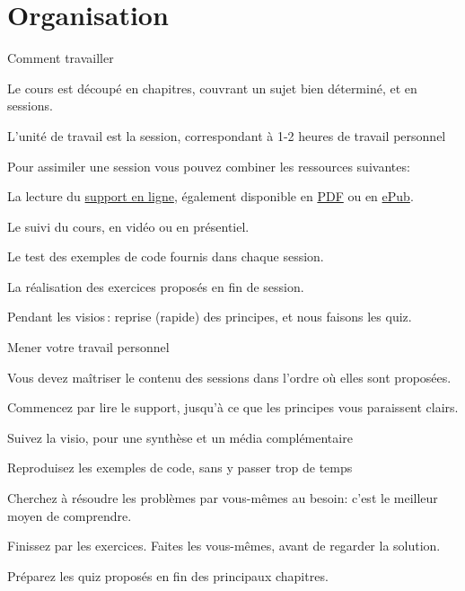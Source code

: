 \section{Organisation}
\begin{frame}{Comment travailler}

Le cours est découpé en \alert{chapitres}, couvrant un sujet bien déterminé, et en \alert{sessions}.

\smallskip

\alert{L'unité de travail est la session}, correspondant à 1-2 heures de travail personnel

\vfill


Pour assimiler une session vous pouvez combiner les ressources suivantes:

\begin{redbullet}
  \item \alert{La lecture} du \href{http://b3d.bdpedia.fr}{support en ligne}, 
       également disponible en \href{http://b3d.bdpedia.fr/files/b3d.pdf}{PDF} ou en 
       \href{http://b3d.bdpedia.fr/files/b3d.epub}{ePub}.
    \item \alert{Le suivi du cours}, en vidéo ou en présentiel.
   \item \alert{Le test des exemples de code} fournis dans chaque session.
   \item \alert{La réalisation des exercices} proposés en fin de session.
\end{redbullet}

\vfill
\begin{blocgauche}
Pendant les visios\,: reprise (rapide) des principes, et nous
faisons les quiz.
\end{blocgauche}

\end{frame}

\begin{frame}{Mener votre travail personnel}

Vous devez maîtriser le contenu des sessions \alert{dans l'ordre
où elles sont proposées}.

\vfill

\alert{Commencez par lire le support}, jusqu'à ce que les principes vous paraissent clairs.

\vfill

\alert{Suivez la visio}, pour une synthèse et un média complémentaire

\vfill

Reproduisez les exemples de code, \alert{sans y passer trop de temps}

\vfill

\begin{blocgauche}
\alert{Cherchez
à résoudre les problèmes par vous-mêmes} au besoin: c'est le meilleur moyen de comprendre.

\vfill

\alert{Finissez par les exercices}. Faites les vous-mêmes, avant de regarder la solution.

\vfill

\alert{Préparez les quiz} proposés en fin des principaux chapitres.
\end{blocgauche}

\end{frame}

